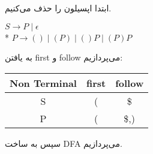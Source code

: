 
ابتدا اپسیلون را حذف می‌کنیم.

\begin{center}
$S \rightarrow P \; | \; \epsilon$
\\*
$P \rightarrow () \; | \; (P) \; | \; ()P \; | \; (P)P$
\end{center}
به یافتن first و follow می‌پردازیم:

\begin{center}
    \begin{latin}
        \begin{tabular}{|c|c|c|}
            \hline
            Non Terminal & first & follow \\ \hline
            S            & (     & \$     \\ \hline
            P            & (     & \$,)  \\ \hline
        \end{tabular}
    \end{latin}
\end{center}

سپس به ساخت DFA می‌پردازیم.

